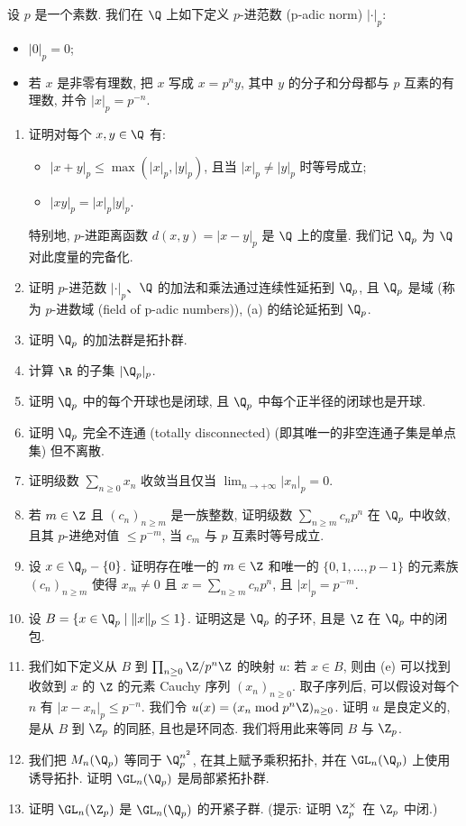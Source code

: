 \begin{exercise}[$p$-进数域 $\Q_p$]
\label{ex:I.5.1.4}
设 $p$ 是一个素数. 我们在 $\Q$ 上如下定义 $p$-进范数 (p-adic norm) $|\cdot|_p$:
\begin{itemize}
\item $|0|_p = 0$;
\item 若 $x$ 是非零有理数, 把 $x$ 写成 $x = p^ny$, 其中 $y$ 的分子和分母都与 $p$ 互素的有理数, 并令 $|x|_p = p^{-n}$.
\end{itemize}
\begin{enumerate}
\item[(a)] 证明对每个 $x, y \in \Q$ 有:
  \begin{itemize}
  \item $|x + y|_p \leq \max(|x|_p, |y|_p)$, 且当 $|x|_p \neq |y|_p$ 时等号成立;
  \item $|xy|_p = |x|_p|y|_p$.
  \end{itemize}
特别地, $p$-进距离函数 $d(x, y) = |x - y|_p$ 是 $\Q$ 上的度量. 我们记 $\Q_p$ 为 $\Q$ 对此度量的完备化.
\item[(a)] 证明 $p$-进范数 $|\cdot|_p$、$\Q$ 的加法和乘法通过连续性延拓到 $\Q_p$, 且 $\Q_p$ 是域 (称为 $p$-进数域 (field of p-adic numbers)), (a) 的结论延拓到 $\Q_p$.
\item[(b)] 证明 $\Q_p$ 的加法群是拓扑群.
\item[(c)] 计算 $\R$ 的子集 $|\Q_p|_p$.
\item[(d)] 证明 $\Q_p$ 中的每个开球也是闭球, 且 $\Q_p$ 中每个正半径的闭球也是开球.
\item[(e)] 证明 $\Q_p$ 完全不连通 (totally disconnected) (即其唯一的非空连通子集是单点集) 但不离散.
\item[(f)] 证明级数 $\sum_{n \geq 0}x_n$ 收敛当且仅当 $\lim_{n \to +\infty}|x_n|_p = 0$.
\item[(g)] 若 $m \in \Z$ 且 $(c_n)_{n \geq m}$ 是一族整数, 证明级数 $\sum_{n \geq m}c_np^n$ 在 $\Q_p$ 中收敛, 且其 $p$-进绝对值 $\leq p^{-m}$, 当 $c_m$ 与 $p$ 互素时等号成立.
\item[(h)] 设 $x \in \Q_p - \{0\}$. 证明存在唯一的 $m \in \Z$ 和唯一的 $\{0, 1, \ldots, p-1\}$ 的元素族 $(c_n)_{n \geq m}$ 使得 $x_m \neq 0$ 且 $x = \sum_{n \geq m}c_np^n$, 且 $|x|_p = p^{-m}$.
\item[(i)] 设 $B = \{x \in \Q_p \mid \|x\|_p \leq 1\}$. 证明这是 $\Q_p$ 的子环, 且是 $\Z$ 在 $\Q_p$ 中的闭包.
\item[(j)] 我们如下定义从 $B$ 到 $\prod_{n \geq 0}\Z/p^n\Z$ 的映射 $u$: 若 $x \in B$, 则由 (e) 可以找到收敛到 $x$ 的 $\Z$ 的元素 Cauchy 序列 $(x_n)_{n \geq 0}$. 取子序列后, 可以假设对每个 $n$ 有 $|x - x_n|_p \leq p^{-n}$. 我们令 $u(x) = (x_n \bmod p^n\Z)_{n \geq 0}$.
  证明 $u$ 是良定义的, 是从 $B$ 到 $\Z_p$ 的同胚, 且也是环同态. 我们将用此来等同 $B$ 与 $\Z_p$.
\item[(k)] 我们把 $M_n(\Q_p)$ 等同于 $\Q_p^{n^2}$, 在其上赋予乘积拓扑, 并在 $\GL_n(\Q_p)$ 上使用诱导拓扑. 证明 $\GL_n(\Q_p)$ 是局部紧拓扑群.
\item[(l)] 证明 $\GL_n(\Z_p)$ 是 $\GL_n(\Q_p)$ 的开紧子群. (提示: 证明 $\Z_p^{\times}$ 在 $\Z_p$ 中闭.)
\end{enumerate}
\end{exercise}

